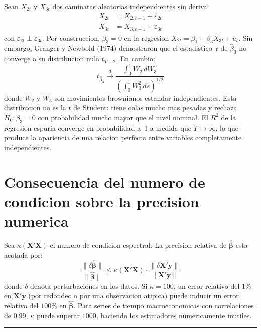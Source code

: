 \documentclass[12pt, letterpaper]{article}
\theoremstyle{remark}
\begin{document}
Sean $X_{2t}$ y $X_{3t}$ dos caminatas aleatorias independientes sin deriva:
\begin{align}
  X_{2t} &= X_{2,t-1} + \varepsilon_{2t}\\
  X_{3t} &= X_{3,t-1} + \varepsilon_{3t}
\end{align}
con $\varepsilon_{2t} \perp \varepsilon_{3t}$. Por construccion,
$\beta_3 = 0$ en la regresion $X_{2t} = \beta_1 + \beta_3 X_{3t} + u_t$.
Sin embargo, Granger y Newbold (1974) demostraron que el estadistico~$t$ de
$\hat\beta_3$ no converge a su distribucion nula $t_{T-2}$. En cambio:
\begin{equation}
  t_{\hat\beta_3} \xrightarrow{d} \frac{\int_0^1 W_2\, dW_3}
                                        {\left(\int_0^1 W_3^2\,ds\right)^{1/2}}
  \label{eq:t_espurio}
\end{equation}
donde $W_2$ y $W_3$ son movimientos brownianos estandar independientes.
Esta distribucion no es la $t$ de Student: tiene colas mucho mas pesadas
y rechaza $H_0: \beta_3 = 0$ con probabilidad mucho mayor que el nivel
nominal. El $R^2$ de la regresion espuria converge en probabilidad a~1
a medida que $T \to \infty$, lo que produce la apariencia de una relacion
perfecta entre variables completamente independientes.

\section{Consecuencia del numero de condicion sobre la precision numerica}

Sea $\kappa(\mathbf{X'X})$ el numero de condicion espectral. La precision
relativa de $\hat{\boldsymbol{\beta}}$ esta acotada por:
\begin{equation}
  \frac{\|\delta\hat{\boldsymbol{\beta}}\|}{\|\hat{\boldsymbol{\beta}}\|}
  \leq \kappa(\mathbf{X'X}) \cdot
  \frac{\|\delta\mathbf{X'y}\|}{\|\mathbf{X'y}\|}
  \label{eq:cond_bound}
\end{equation}
donde $\delta$ denota perturbaciones en los datos. Si $\kappa = 100$, un
error relativo del $1\%$ en $\mathbf{X'y}$ (por redondeo o por una
observacion atipica) puede inducir un error relativo del $100\%$ en
$\hat{\boldsymbol{\beta}}$. Para series de tiempo macroeconomicas con
correlaciones de $0.99$, $\kappa$ puede superar $1000$, haciendo los
estimadores numericamente inutiles.

\vspace{14pt}
\noindent\rule{\linewidth}{0.4pt}

\end{document}

